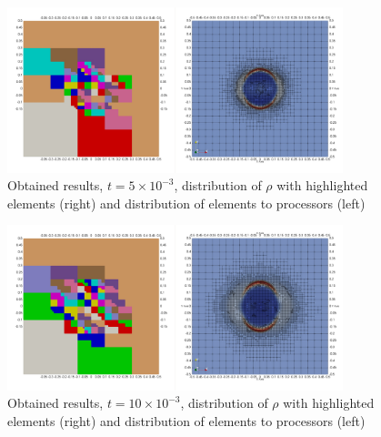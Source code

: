 \begin{figure}[H]
	\begin{center}
		\includegraphics[width=0.87\textwidth]{img/mhd-blast/old/mya2.jpg}
	\caption{Obtained results, $t = 5\times 10^{-3}$, distribution of $\rho$ with highlighted elements (right) and distribution of elements to processors (left)}
	\label{figure:blastOldMyAdapt2}
	\end{center}
\end{figure}
\vspace{-8mm}

\begin{figure}[H]
	\begin{center}
		\includegraphics[width=0.87\textwidth]{img/mhd-blast/old/mya3.jpg}
	\caption{Obtained results, $t = 10\times 10^{-3}$, distribution of $\rho$ with highlighted elements (right) and distribution of elements to processors (left)}
	\label{figure:blastOldMyAdapt3}
	\end{center}
\end{figure}
\vspace{-8mm}

